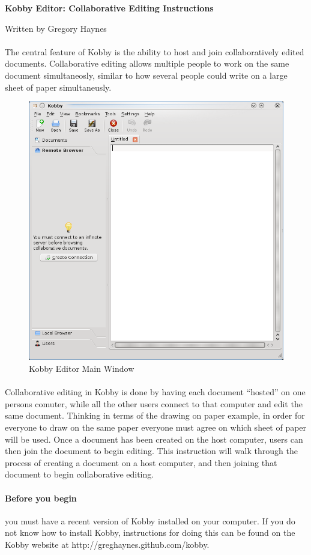 \documentclass[11pt]{article}
\begin{document}
\centerline {\Large \bf Kobby Editor: Collaborative Editing Instructions}
\centerline {Written by Gregory Haynes}

\paragraph{}The central feature of Kobby is the ability to host and join collaboratively edited documents.  Collaborative editing allows multiple people to work on the same document simultaneosly, similar to how several people could write on a large sheet of paper simultaneusly.

\begin{figure}[tbh]
\begin{center}
\includegraphics[width=.7\textwidth]{kobbymain.png}
\end{center}
\caption{Kobby Editor Main Window}
\end{figure}

\paragraph{}Collaborative editing in Kobby is done by having each document ``hosted'' on one persons comuter, while all the other users connect to that computer and edit the same document.  Thinking in terms of the drawing on paper example, in order for everyone to draw on the same paper everyone must agree on which sheet of paper will be used.  Once a document has been created on the host computer, users can then join the document to begin editing.  This instruction will walk through the process of creating a document on a host computer, and then joining that document to begin collaborative editing.

\paragraph{Before you begin} you must have a recent version of Kobby installed on your computer.  If you do not know how to install Kobby, instructions for doing this can be found on the Kobby website at http://greghaynes.github.com/kobby.

\paragraph{}
\end{document}

